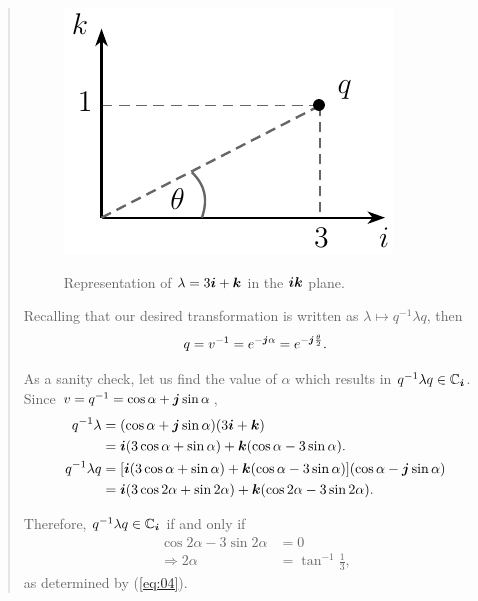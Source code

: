 \begin{quotation}
\begin{example}
        \begin{figure}
            \centering
            \caption{Representation of $ \lambda = 3\boldsymbol{i} + \boldsymbol{k} $ in the $ \boldsymbol{i} \boldsymbol{k} $ plane.}
            \includegraphics[width=0.3\linewidth]{Figures/quaternion01.pdf}
            \floatsource
            \label{fig:quat3ik}
        \end{figure}

        Recalling that our desired transformation is written as $ \lambda \mapsto q^{-1} \lambda q $, then
        \begin{equation}
            q = v^{-1} = e^{- \boldsymbol{j} \alpha} = e^{- \boldsymbol{j} \frac{\theta}{2}}.
        \end{equation}

        As a sanity check, let us find the value of $ \alpha $ which results in $ q^{-1} \lambda q \in \mathbb{C}_{\boldsymbol{i}} $. Since $ v = q^{-1} = \cos \alpha + \boldsymbol{j} \sin \alpha $,
        \begin{equation}
            \begin{aligned}
                q^{-1} \lambda   & = (\cos \alpha + \boldsymbol{j} \sin \alpha)(3 \boldsymbol{i} + \boldsymbol{k})                                                          \\
                                 & = \boldsymbol{i}(3 \cos \alpha + \sin \alpha) + \boldsymbol{k}(\cos \alpha - 3 \sin \alpha).                                  \\
                q^{-1} \lambda q & = [\boldsymbol{i}(3 \cos \alpha + \sin \alpha) + \boldsymbol{k}(\cos \alpha - 3 \sin \alpha)] (\cos \alpha - \boldsymbol{j} \sin \alpha) \\
                                 & = \boldsymbol{i} (3 \cos 2\alpha + \sin 2\alpha) + \boldsymbol{k}(\cos 2\alpha - 3 \sin 2\alpha).
            \end{aligned}
        \end{equation}

        Therefore, $ q^{-1} \lambda q \in \mathbb{C}_{\boldsymbol{i}} $ if and only if
        \begin{equation}
            \begin{aligned}\textbf{}
                \cos 2\alpha - 3 \sin 2\alpha & = 0                      \\
                \Rightarrow 2\alpha           & = \tan^{-1} \frac{1}{3},
            \end{aligned}
        \end{equation}
        as determined by (\ref{eq:04}).


\end{example}
\end{quotation}
